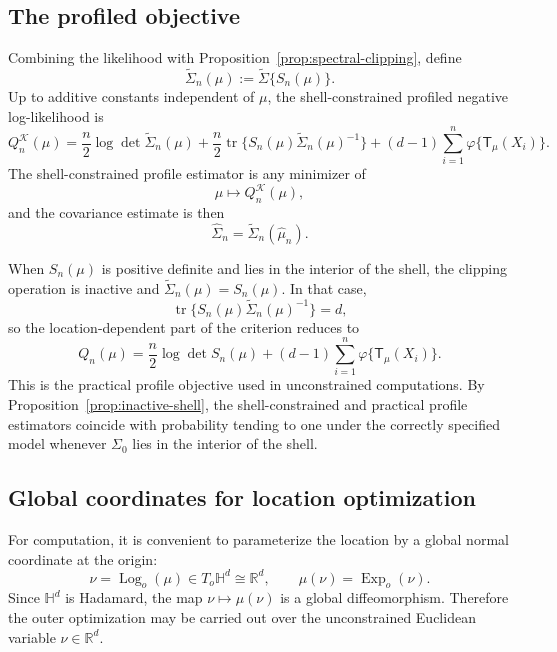 \documentclass[11pt]{article}
\DeclareMathOperator{\tr}{tr}
\newcommand{\R}{\mathbb{R}}
\newcommand{\Hh}{\mathbb{H}}
\newcommand{\Exp}{\operatorname{Exp}}
\newcommand{\Log}{\operatorname{Log}}
\newcommand{\shell}{\mathcal{K}}
\newcommand{\psiwrap}{\varphi}
\newcommand{\T}{\mathsf{T}}
\begin{document}
\subsection{The profiled objective}

Combining the likelihood with Proposition~\ref{prop:spectral-clipping}, define
\[
\widetilde\Sigma_n(\mu)
:=
\widetilde\Sigma\{S_n(\mu)\}.
\]
Up to additive constants independent of $\mu$, the shell-constrained profiled negative log-likelihood is
\begin{equation}
\label{eq:shell-profile-objective}
Q_n^{\shell}(\mu)
=
\frac n2\log\det\widetilde\Sigma_n(\mu)
+
\frac n2\tr\{S_n(\mu)\widetilde\Sigma_n(\mu)^{-1}\}
+
(d-1)\sum_{i=1}^n
\psiwrap\{\T_\mu(X_i)\}.
\end{equation}
The shell-constrained profile estimator is any minimizer of
\[
\mu\mapsto Q_n^{\shell}(\mu),
\]
and the covariance estimate is then
\[
\hat\Sigma_n=\widetilde\Sigma_n(\hat\mu_n).
\]

When $S_n(\mu)$ is positive definite and lies in the interior of the shell, the clipping operation is inactive and $\widetilde\Sigma_n(\mu)=S_n(\mu)$. In that case,
\[
\tr\{S_n(\mu)\widetilde\Sigma_n(\mu)^{-1}\}=d,
\]
so the location-dependent part of the criterion reduces to
\begin{equation}
\label{eq:practical-objective}
Q_n(\mu)
=
\frac n2\log\det S_n(\mu)
+
(d-1)\sum_{i=1}^n
\psiwrap\{\T_\mu(X_i)\}.
\end{equation}
This is the practical profile objective used in unconstrained computations. By Proposition~\ref{prop:inactive-shell}, the shell-constrained and practical profile estimators coincide with probability tending to one under the correctly specified model whenever $\Sigma_0$ lies in the interior of the shell.

\subsection{Global coordinates for location optimization}

For computation,  it is convenient to parameterize the location by a global normal coordinate at the origin:
\begin{equation}
\label{eq:u-chart}
\nu=\Log_o(\mu)\in T_o\Hh^d\cong \R^d,
\qquad
\mu(\nu)=\Exp_o(\nu).
\end{equation}
Since $\Hh^d$ is Hadamard, the map $
\nu\mapsto\mu(\nu)
$
is a global diffeomorphism. Therefore the outer optimization may be carried out over the unconstrained Euclidean variable $\nu\in\R^d$.
\end{document}
